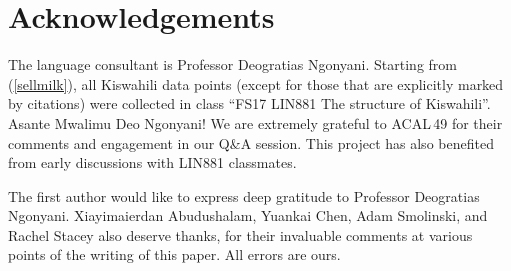 \documentclass[output=paper]{langscibook}
\begin{document}
\section*{Acknowledgements}
The language consultant is Professor Deogratias Ngonyani. Starting from (\ref{sellmilk}), all Kiswahili data points (except for those that are explicitly marked by citations) were collected in class ``FS17 LIN881 The structure of Kiswahili''. Asante Mwalimu Deo Ngonyani! We are extremely grateful to ACAL\,49 for their comments and engagement in our Q\&A session. This project has also benefited from early discussions with LIN881 classmates.

The first author would like to express deep gratitude to Professor Deogratias Ngonyani. Xiayimaierdan Abudushalam, Yuankai Chen, Adam Smolinski, and Rachel Stacey also deserve thanks, for their invaluable comments at various points of the writing of this paper. All errors are ours. 

\printbibliography[heading=subbibliography,notkeyword=this]
\end{document}
